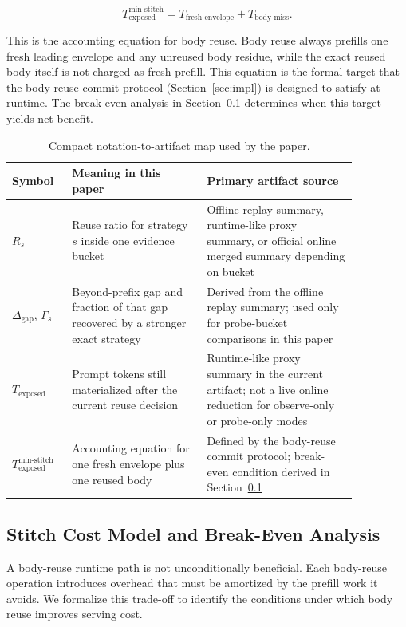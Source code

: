 \documentclass[conference]{IEEEtran}
\begin{document}
\[
T_{\text{exposed}}^{\text{min-stitch}} = T_{\text{fresh-envelope}} + T_{\text{body-miss}}.
\]

This is the accounting equation for body reuse. Body reuse always prefills one fresh leading envelope and any unreused body residue, while the exact reused body itself is not charged as fresh prefill. This equation is the formal target that the body-reuse commit protocol (Section~\ref{sec:impl}) is designed to satisfy at runtime. The break-even analysis in Section~\ref{sec:cost-model} determines when this target yields net benefit.

\begin{table}[t]
\caption{Compact notation-to-artifact map used by the paper.}
\label{tab:notation-artifact-map}
\centering
\footnotesize
\setlength{\tabcolsep}{3pt}
\begin{tabular}{@{}P{0.14\linewidth}P{0.34\linewidth}P{0.38\linewidth}@{}}
\toprule
Symbol & Meaning in this paper & Primary artifact source \\
\midrule
$R_s$ & Reuse ratio for strategy $s$ inside one evidence bucket & Offline replay summary, runtime-like proxy summary, or official online merged summary depending on bucket \\
$\Delta_{\text{gap}}$, $\Gamma_s$ & Beyond-prefix gap and fraction of that gap recovered by a stronger exact strategy & Derived from the offline replay summary; used only for probe-bucket comparisons in this paper \\
$T_{\text{exposed}}$ & Prompt tokens still materialized after the current reuse decision & Runtime-like proxy summary in the current artifact; not a live online reduction for observe-only or probe-only modes \\
$T_{\text{exposed}}^{\text{min-stitch}}$ & Accounting equation for one fresh envelope plus one reused body & Defined by the body-reuse commit protocol; break-even condition derived in Section~\ref{sec:cost-model} \\
\bottomrule
\end{tabular}
\end{table}

\subsection{Stitch Cost Model and Break-Even Analysis}
\label{sec:cost-model}

A body-reuse runtime path is not unconditionally beneficial. Each body-reuse operation introduces overhead that must be amortized by the prefill work it avoids. We formalize this trade-off to identify the conditions under which body reuse improves serving cost.
\end{document}
